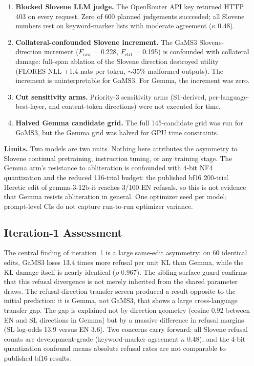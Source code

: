 \documentclass[11pt,letterpaper]{article}
\begin{document}
\begin{enumerate}
\item \textbf{Blocked Slovene LLM judge.} The OpenRouter API key returned HTTP 403 on every request. Zero of 600 planned judgements succeeded; all Slovene numbers rest on keyword-marker lists with moderate agreement ($\kappa$ 0.48).
\item \textbf{Collateral-confounded Slovene increment.} The GaMS3 Slovene-direction increment ($F_\mathrm{raw}$ = 0.228, $F_\mathrm{ctrl}$ = 0.195) is confounded with collateral damage: full-span ablation of the Slovene direction destroyed utility (FLORES NLL +1.4 nats per token, $\sim$35\% malformed outputs). The increment is uninterpretable for GaMS3. For Gemma, the increment was zero.
\item \textbf{Cut sensitivity arms.} Priority-3 sensitivity arms (S1-derived, per-language-best-layer, and content-token directions) were not executed for time.
\item \textbf{Halved Gemma candidate grid.} The full 145-candidate grid was run for GaMS3, but the Gemma grid was halved for GPU time constraints.
\end{enumerate}

\textbf{Limits.} Two models are two units. Nothing here attributes the asymmetry to Slovene continual pretraining, instruction tuning, or any training stage. The Gemma arm's resistance to abliteration is confounded with 4-bit NF4 quantization and the reduced 116-trial budget: the published bf16 200-trial Heretic edit of gemma-3-12b-it reaches 3/100 EN refusals, so this is not evidence that Gemma resists abliteration in general. One optimizer seed per model; prompt-level CIs do not capture run-to-run optimizer variance.

\subsection{Iteration-1 Assessment}

The central finding of iteration~1 is a large same-edit asymmetry: on 60 identical edits, GaMS3 loses 13.4 times more refusal per unit KL than Gemma, while the KL damage itself is nearly identical ($\rho$ 0.967). The sibling-surface guard confirms that this refusal divergence is not merely inherited from the shared parameter draws. The refusal-direction transfer screen produced a result opposite to the initial prediction: it is Gemma, not GaMS3, that shows a large cross-language transfer gap. The gap is explained not by direction geometry (cosine 0.92 between EN and SL directions in Gemma) but by a massive difference in refusal margins (SL log-odds 13.9 versus EN 3.6). Two concerns carry forward: all Slovene refusal counts are development-grade (keyword-marker agreement $\kappa$ 0.48), and the 4-bit quantization confound means absolute refusal rates are not comparable to published bf16 results.
\end{document}
